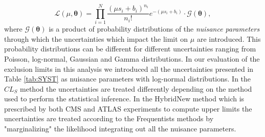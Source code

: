 \begin{equation}\label{eq:LL}
\mathcal{L}\left( \mu, \mathbf{\theta} \right) = \prod^{N}_{i=1} \frac{{\left( \mu s_{i} + b_{i} \right)}^{n_{i}}}{n_{i}!} e^{-(\mu s_{i} + b_{i})} \cdot \mathcal{G}(\mathbf{\theta} ),
\end{equation}
where $\mathcal{G}(\mathbf{\theta})$ is a product of probability distributions of the \textit{nuisance parameters} through which the uncertainties which impact the limit on $\mu$ are introduced. This probability distributions can be different for different uncertainties ranging from Poisson, log-normal, Gaussian and Gamma distributions. In our evaluation of the exclusion limits in this analysis we introduced all the uncertainties presented in Table \ref{tab:SYST} as nuisance parameters with log-normal distributions.
In the $CL_{S}$ method the uncertainties are treated differently depending on the method used to perform the statistical inference. In the HybridNew method which is prescribed by both CMS and ATLAS experiments to compute upper limits  the uncertainties are treated according to the Frequentists methods by "marginalizing" the likelihood \ie integrating out all the nuisance parameters. 

